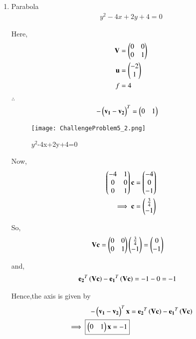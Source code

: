 \documentclass[journal,12pt,twocolumn]{IEEEtran}
\begin{document}
\begin{enumerate}
    \item Parabola
    \begin{align}
    y^2-4x+2y+4 = 0
    \end{align}
    
    Here,
    \begin{align}
    \mathbf{V} &= \begin{pmatrix}0 & 0 \\ 0 & 1\end{pmatrix} \\
    \mathbf{u} &= \begin{pmatrix}-2 \\ 1\end{pmatrix} \\
    f &= 4
    \end{align}

    $\therefore$
    \begin{align}
    -\begin{pmatrix}\mathbf{v_1}-\mathbf{v_2}\end{pmatrix}^T &= \begin{pmatrix}0 & 1\end{pmatrix}
    \end{align}
    
    \begin{figure}[!ht]
    \centering
    \texttt{[image: ChallengeProblem5\_2.png]}
    \caption{$y^2$-4x+2y+4=0}
    \label{ex2}	
    \end{figure}
    Now,
    \begin{align}
    \begin{pmatrix}-4 & 1 \\ 0 & 0 \\ 0 & 1\end{pmatrix}\mathbf{c} &= \begin{pmatrix}-4 \\ 0 \\ -1\end{pmatrix}
    \\
    \implies \mathbf{c} &= \begin{pmatrix}\frac{3}{4} \\ -1\end{pmatrix}
    \end{align}

    So,
    \begin{align}
    \mathbf{V}\mathbf{c} &= \begin{pmatrix}0 & 0 \\ 0 & 1\end{pmatrix}\begin{pmatrix}\frac{3}{4} \\ -1\end{pmatrix}=\begin{pmatrix}0 \\ -1\end{pmatrix}
    \end{align}

    and,
    \begin{align}
    \mathbf{e_2}^T\left(\mathbf{V}\mathbf{c}\right) - \mathbf{e_1}^T\left(\mathbf{V}\mathbf{c}\right) &= -1-0=-1
    \end{align}

    Hence,the axis is given by
    \begin{align}
    -\begin{pmatrix}\mathbf{v_1}-\mathbf{v_2}\end{pmatrix}^T\mathbf{x} &= \mathbf{e_2}^T\left(\mathbf{V}\mathbf{c}\right) - \mathbf{e_1}^T\left(\mathbf{V}\mathbf{c}\right) \\
    \implies \boxed{\begin{pmatrix}0 & 1\end{pmatrix}\mathbf{x} = -1}
    \end{align}
    

\end{enumerate}
\end{document}

